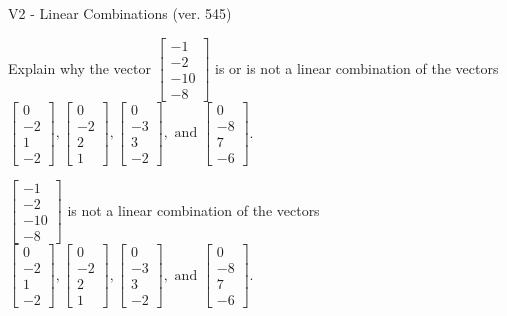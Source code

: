 \begin{exercise}
  \begin{exerciseTitle}V2 - Linear Combinations (ver. 545)\end{exerciseTitle}
  \begin{exerciseStatement}
    Explain why the vector \(\left[\begin{array}{c}
-1 \\
-2 \\
-10 \\
-8
\end{array}\right]\)  is or is not a linear 
	combination of the vectors \(\left[\begin{array}{c}
0 \\
-2 \\
1 \\
-2
\end{array}\right] , \left[\begin{array}{c}
0 \\
-2 \\
2 \\
1
\end{array}\right] , \left[\begin{array}{c}
0 \\
-3 \\
3 \\
-2
\end{array}\right] , \text{ and } \left[\begin{array}{c}
0 \\
-8 \\
7 \\
-6
\end{array}\right]\).
	


  \end{exerciseStatement}
  \begin{exerciseAnswer}
   \(\left[\begin{array}{c}
-1 \\
-2 \\
-10 \\
-8
\end{array}\right]\) 
  	 is not  
	a linear combination of the vectors \(\left[\begin{array}{c}
0 \\
-2 \\
1 \\
-2
\end{array}\right] , \left[\begin{array}{c}
0 \\
-2 \\
2 \\
1
\end{array}\right] , \left[\begin{array}{c}
0 \\
-3 \\
3 \\
-2
\end{array}\right] , \text{ and } \left[\begin{array}{c}
0 \\
-8 \\
7 \\
-6
\end{array}\right]\).


\end{exerciseAnswer}
\end{exercise}
